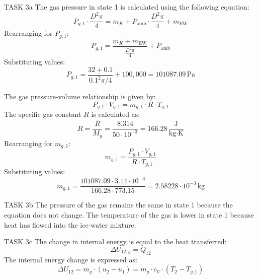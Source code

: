 TASK 3a  
The gas pressure in state 1 is calculated using the following equation:  
\[
P_{g,1} \cdot \frac{D^2 \pi}{4} = m_K + P_{\text{amb}} \cdot \frac{D^2 \pi}{4} + m_{\text{EW}}
\]  
Rearranging for \( P_{g,1} \):  
\[
P_{g,1} = \frac{m_K + m_{\text{EW}}}{\frac{D^2 \pi}{4}} + P_{\text{amb}}
\]  
Substituting values:  
\[
P_{g,1} = \frac{32 + 0.1}{0.1^2 \pi / 4} + 100,000 = 101087.09 \, \text{Pa}
\]  

The gas pressure-volume relationship is given by:  
\[
P_{g,1} \cdot V_{g,1} = m_{g,1} \cdot R \cdot T_{g,1}
\]  
The specific gas constant \( R \) is calculated as:  
\[
R = \frac{\bar{R}}{M_g} = \frac{8.314}{50 \cdot 10^{-3}} = 166.28 \, \frac{\text{J}}{\text{kg·K}}
\]  
Rearranging for \( m_{g,1} \):  
\[
m_{g,1} = \frac{P_{g,1} \cdot V_{g,1}}{R \cdot T_{g,1}}
\]  
Substituting values:  
\[
m_{g,1} = \frac{101087.09 \cdot 3.14 \cdot 10^{-3}}{166.28 \cdot 773.15} = 2.58228 \cdot 10^{-3} \, \text{kg}
\]  

TASK 3b  
The pressure of the gas remains the same in state 1 because the equation does not change.  
The temperature of the gas is lower in state 1 because heat has flowed into the ice-water mixture.  

TASK 3c  
The change in internal energy is equal to the heat transferred:  
\[
\Delta U_{12,g} = Q_{12}
\]  
The internal energy change is expressed as:  
\[
\Delta U_{12} = m_g \cdot (u_2 - u_1) = m_g \cdot c_V \cdot (T_2 - T_{g,1})
\]